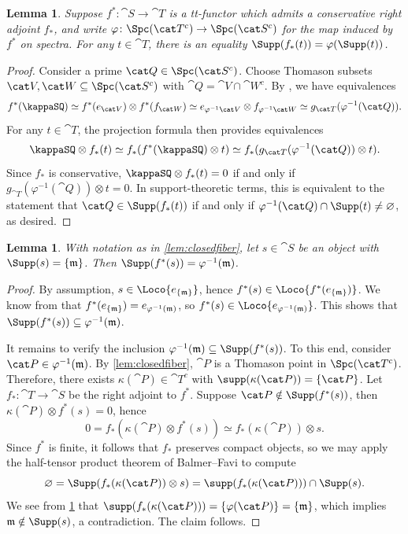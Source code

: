 \documentclass{amsart}%
\numberwithin{equation}{section}%
\newtheorem{Lem}[equation]{Lemma}
\theoremstyle{remark}
\begin{document}
\begin{Lem}\label{lem:ressupp}
Suppose $f^*\colon \cat S \to \cat T$ is a tt-functor which admits a conservative right adjoint $f_*$, and write $\varphi\colon \Spc(\cat T^c) \to \Spc(\cat S^c)$ for the map induced by $f^*$ on spectra. For any $t \in \cat T$, there is an equality $\Supp(f_*(t)) = \varphi(\Supp(t))$.
\end{Lem}
\begin{proof}
Consider a prime $\cat Q \in \Spc(\cat S^c)$. Choose Thomason subsets $\cat V, \cat W \subseteq \Spc(\cat S^c)$ with ${\cat Q} = \cat V \cap \cat W^c$. By \cite[Thm.~6.3]{BalmerFavi11}, we have equivalences
\[
f^*(\kappaSQ) \simeq f^*(e_{\cat V}) \otimes f^*(f_{\cat W}) \simeq e_{\varphi^{-1}\cat V} \otimes f_{\varphi^{-1}\cat W} \simeq  g_{\cat T}(\varphi^{-1}(\cat Q)).
\]
For any $t \in \cat T$, the projection formula then provides equivalences
\[
\kappaSQ \otimes f_*(t) \simeq f_*(f^*(\kappaSQ) \otimes t) \simeq f_*(g_{\cat T}(\varphi^{-1}(\cat Q)) \otimes t).
\]
Since $f_*$ is conservative, $\kappaSQ \otimes f_*(t) = 0$ if and only if $g_{\cat T}(\varphi^{-1}(\cat Q)) \otimes t = 0$. In support-theoretic terms, this is equivalent to the statement that $\cat Q \in \Supp(f_*(t))$ if and only if $\varphi^{-1}(\cat Q) \cap \Supp(t) \neq \varnothing$, as desired.
\end{proof}

\begin{Lem}\label{lem:indfullsupp}
With notation as in \cref{lem:closedfiber}, let $s \in \cat S$ be an object with $\Supp(s) = \{\frak m\}$. Then $\Supp(f^*(s)) = \varphi^{-1}(\frak m)$.
\end{Lem}
\begin{proof}
By assumption, $s \in \Loco{e_{\{\frak m\}}}$, hence $f^*(s) \in \Loco{f^*(e_{\{\frak m\}})}$. We know from \cite[Thm.~6.3]{BalmerFavi11} that $f^*(e_{\{\frak m\}}) = e_{\varphi^{-1}(\frak m)}$, so $f^*(s) \in \Loco{e_{\varphi^{-1}(\frak m)}}$. This shows that $\Supp(f^*(s)) \subseteq \varphi^{-1}(\frak m)$.

It remains to verify the inclusion $\varphi^{-1}(\frak m) \subseteq \Supp(f^*(s))$. To this end, consider $\cat P \in \varphi^{-1}(\frak m)$. By \cref{lem:closedfiber}, $\cat P$ is a Thomason point in $\Spc(\cat T^c)$. Therefore, there exists $\kappa(\cat P) \in \cat T^c$ with $\supp(\kappa(\cat P)) = \{\cat P\}$. Let $f_*\colon \cat T \to \cat S$ be the right adjoint to $f^*$. Suppose $\cat P \notin \Supp(f^*(s))$, then $\kappa(\cat P) \otimes f^*(s) = 0$, hence 
\[
0 = f_*(\kappa(\cat P) \otimes f^*(s)) \simeq f_*(\kappa(\cat P)) \otimes s.
\]
Since $f^*$ is finite, it follows that $f_*$ preserves compact objects, so we may apply the half-tensor product theorem of Balmer--Favi \cite[Thm.~7.22]{BalmerFavi11} to compute 
\[
\varnothing = \Supp(f_*(\kappa(\cat P)) \otimes s) = \supp(f_*(\kappa(\cat P))) \cap \Supp(s).
\]
We see from \cref{lem:ressupp} that $\supp(f_*(\kappa(\cat P))) = \{\varphi(\cat P)\} = \{\frak m\}$, which implies $\frak m \notin \Supp(s)$, a contradiction. The claim follows.
\end{proof}
\end{document}
